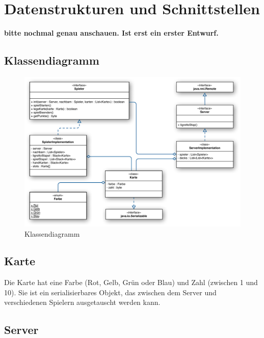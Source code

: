 \section{Datenstrukturen und Schnittstellen} 
\color{red}
\textbf{bitte nochmal genau anschauen. Ist erst ein erster Entwurf.}
\color{black}


\newpage
\subsection{Klassendiagramm}

\begin{figure}[h]
	\centering
	\includegraphics[width=1.0\textwidth,angle=0]{graphics/klassendiagramm.pdf}
	\caption{Klassendiagramm \hfill{} }
\end{figure}


\subsection{Karte}

Die Karte hat eine Farbe (Rot, Gelb, Grün oder Blau) und Zahl (zwischen 1 und 10). Sie ist ein serialisierbares Objekt, das zwischen dem Server und verschiedenen Spielern ausgetauscht werden kann.




\subsection{Server}

